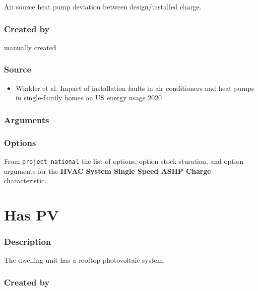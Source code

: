 Air source heat pump deviation between design/installed charge.

\subsubsection{Created by}\label{created-by-84}

manually created

\subsubsection{Source}\label{source-83}

\begin{itemize}
 
\item
  Winkler et al. \textquotesingle Impact of installation faults in air
  conditioners and heat pumps in single-family homes on US energy
  usage\textquotesingle{} 2020
\end{itemize}

\subsubsection{Arguments}\label{arguments-53}



\subsubsection{Options}\label{options-84}

From \texttt{project\_national} the list of options, option stock
sturation, and option arguments for the \textbf{HVAC System Single Speed
ASHP Charge} characteristic.



\section{Has PV}\label{has_pv}

\subsubsection{Description}\label{description-85}

The dwelling unit has a rooftop photovoltaic system.

\subsubsection{Created by}\label{created-by-85}

